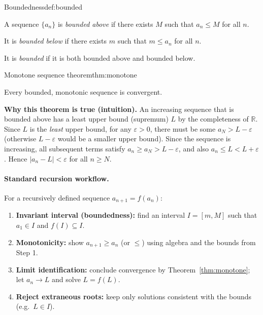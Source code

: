 \begin{definition}{Boundedness}{def:bounded}

A sequence $\{a_n\}$ is \emph{bounded above} if there exists $M$ such that $a_n\le M$ for all $n$.

It is \emph{bounded below} if there exists $m$ such that $m\le a_n$ for all $n$.

It is \emph{bounded} if it is both bounded above and bounded below.

\end{definition}

\begin{theorem}{Monotone sequence theorem}{thm:monotone}

Every bounded, monotonic sequence is convergent.

\end{theorem}

\noindent
\textbf{Why this theorem is true (intuition).}
An increasing sequence that is bounded above has a least upper bound (supremum) $L$ by the completeness of $\mathbb{R}$. Since $L$ is the \emph{least} upper bound, for any $\varepsilon>0$, there must be some $a_N>L-\varepsilon$ (otherwise $L-\varepsilon$ would be a smaller upper bound). Since the sequence is increasing, all subsequent terms satisfy $a_n\ge a_N>L-\varepsilon$, and also $a_n\le L<L+\varepsilon$. Hence $|a_n-L|<\varepsilon$ for all $n\ge N$.

\paragraph{Standard recursion workflow.}

For a recursively defined sequence $a_{n+1}=f(a_n)$:

\begin{enumerate}[leftmargin=3em]

\item \textbf{Invariant interval (boundedness):} find an interval $I=[m,M]$ such that $a_1\in I$ and $f(I)\subseteq I$.

\item \textbf{Monotonicity:} show $a_{n+1}\ge a_n$ (or $\le$) using algebra and the bounds from Step 1.

\item \textbf{Limit identification:} conclude convergence by Theorem~\ref{thm:monotone}; let $a_n\to L$ and solve $L=f(L)$.

\item \textbf{Reject extraneous roots:} keep only solutions consistent with the bounds (e.g.\ $L\in I$).

\end{enumerate}

